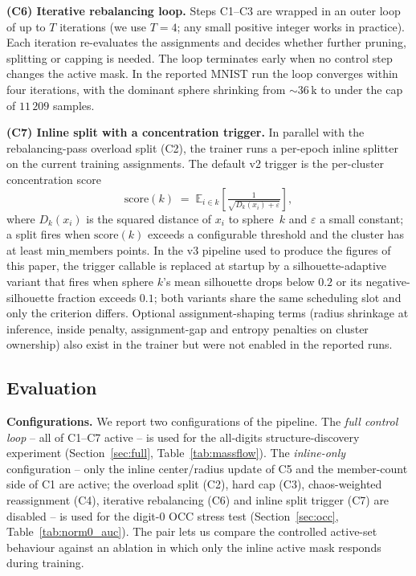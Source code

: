 \documentclass[conference]{IEEEtran}
\begin{document}
\textbf{(C6) Iterative rebalancing loop.} Steps C1--C3 are wrapped in an outer loop of up to \(T\) iterations (we use \(T\!=\!4\); any small positive integer works in practice). Each iteration re-evaluates the assignments and decides whether further pruning, splitting or capping is needed. The loop terminates early when no control step changes the active mask. In the reported MNIST run the loop converges within four iterations, with the dominant sphere shrinking from \(\sim\!36\,\mathrm{k}\) to under the cap of \(11\,209\) samples.

\textbf{(C7) Inline split with a concentration trigger.} In parallel with the rebalancing-pass overload split (C2), the trainer runs a per-epoch inline splitter on the current training assignments. The default v2 trigger is the per-cluster concentration score
\begin{equation}
\mathrm{score}(k) \;=\; \mathbb{E}_{i\in k}\!\left[\tfrac{1}{\sqrt{D_{k}(x_{i})+\varepsilon}}\right],
\label{eq:concentration}
\end{equation}
where \(D_{k}(x_{i})\) is the squared distance of \(x_{i}\) to sphere~\(k\) and \(\varepsilon\) a small constant; a split fires when \(\mathrm{score}(k)\) exceeds a configurable threshold and the cluster has at least \(\mathrm{min\_members}\) points. In the v3 pipeline used to produce the figures of this paper, the trigger callable is replaced at startup by a silhouette-adaptive variant that fires when sphere \(k\)'s mean silhouette drops below \(0.2\) or its negative-silhouette fraction exceeds \(0.1\); both variants share the same scheduling slot and only the criterion differs. Optional assignment-shaping terms (radius shrinkage at inference, inside penalty, assignment-gap and entropy penalties on cluster ownership) also exist in the trainer but were not enabled in the reported runs.

\subsection{Evaluation}
\textbf{Configurations.} We report two configurations of the pipeline. The \emph{full control loop} -- all of C1--C7 active -- is used for the all-digits structure-discovery experiment (Section~\ref{sec:full}, Table~\ref{tab:massflow}). The \emph{inline-only} configuration -- only the inline center/radius update of C5 and the member-count side of C1 are active; the overload split (C2), hard cap (C3), chaos-weighted reassignment (C4), iterative rebalancing (C6) and inline split trigger (C7) are disabled -- is used for the digit-0 OCC stress test (Section~\ref{sec:occ}, Table~\ref{tab:norm0_auc}). The pair lets us compare the controlled active-set behaviour against an ablation in which only the inline active mask responds during training.
\end{document}
